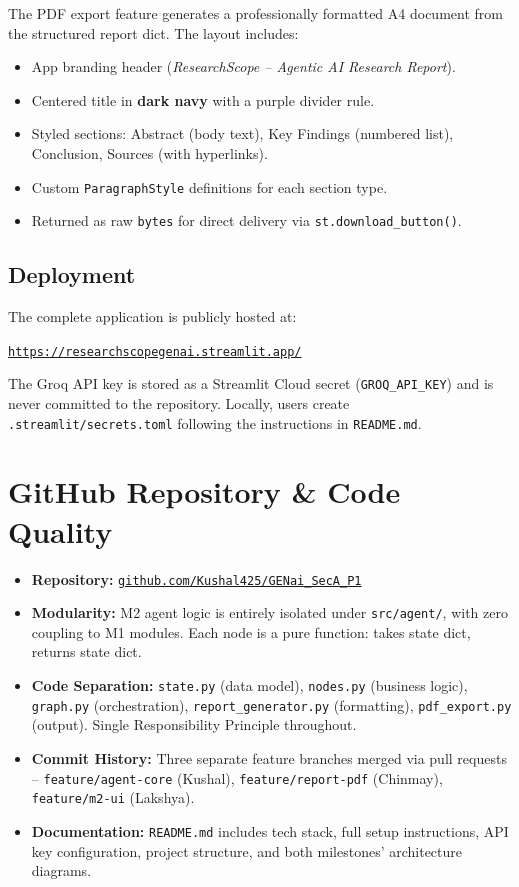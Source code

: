 \documentclass[12pt, a4paper]{article}
\begin{document}
The PDF export feature generates a professionally formatted A4 document from the structured report dict. The layout includes:
\begin{itemize}
  \item App branding header (\textit{ResearchScope -- Agentic AI Research Report}).
  \item Centered title in \textbf{dark navy} with a purple divider rule.
  \item Styled sections: Abstract (body text), Key Findings (numbered list), Conclusion, Sources (with hyperlinks).
  \item Custom \texttt{ParagraphStyle} definitions for each section type.
  \item Returned as raw \texttt{bytes} for direct delivery via \texttt{st.download\_button()}.
\end{itemize}

\subsection{Deployment}
The complete application is publicly hosted at:
\begin{center}
\href{https://researchscopegenai.streamlit.app/}{\texttt{https://researchscopegenai.streamlit.app/}}
\end{center}
The Groq API key is stored as a Streamlit Cloud secret (\texttt{GROQ\_API\_KEY}) and is never committed to the repository. Locally, users create \texttt{.streamlit/secrets.toml} following the instructions in \texttt{README.md}.

\section{GitHub Repository \& Code Quality}

\begin{itemize}
  \item \textbf{Repository:} \href{https://github.com/Kushal425/GENai_SecA_P1}{\texttt{github.com/Kushal425/GENai\_SecA\_P1}}
  \item \textbf{Modularity:} M2 agent logic is entirely isolated under \texttt{src/agent/}, with zero coupling to M1 modules. Each node is a pure function: takes state dict, returns state dict.
  \item \textbf{Code Separation:} \texttt{state.py} (data model), \texttt{nodes.py} (business logic), \texttt{graph.py} (orchestration), \texttt{report\_generator.py} (formatting), \texttt{pdf\_export.py} (output). Single Responsibility Principle throughout.
  \item \textbf{Commit History:} Three separate feature branches merged via pull requests -- \texttt{feature/agent-core} (Kushal), \texttt{feature/report-pdf} (Chinmay), \texttt{feature/m2-ui} (Lakshya).
  \item \textbf{Documentation:} \texttt{README.md} includes tech stack, full setup instructions, API key configuration, project structure, and both milestones' architecture diagrams.
\end{itemize}
\end{document}
